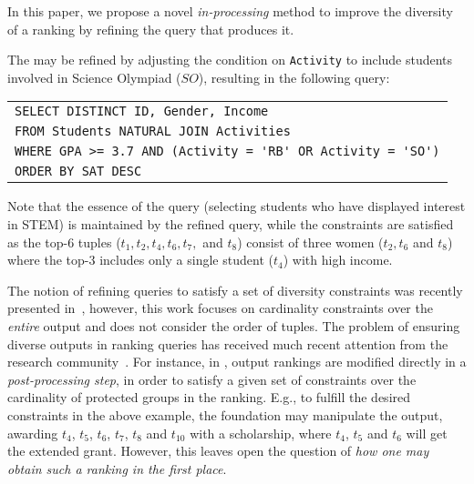  In this paper, we propose a novel \emph{in-processing} method to improve the diversity of a ranking by refining the query that produces it.%
 
 \begin{example}
    \label{ex:first_refinement}
    The \running{} may be refined by adjusting the condition on \verb"Activity" to include students involved in Science Olympiad ($SO$), resulting in the following query:
    \begin{center}
    \footnotesize
    \begin{tabular}{l}
        \verb"SELECT DISTINCT ID, Gender, Income "\\
        \verb"FROM Students NATURAL JOIN Activities"\\
        \verb"WHERE GPA >= 3.7 AND (Activity = 'RB' OR Activity = 'SO')"\\
        \verb"ORDER BY SAT DESC"\\
    \end{tabular}
    \end{center}
    Note that the essence of the query (selecting students who have displayed interest in STEM) is maintained by the refined query, while the constraints are satisfied as the top-$6$ tuples ($t_1, t_2, t_4, t_6, t_7,$ and $t_8$) consist of three women ($t_2, t_6$ and $t_8$) where the top-$3$ includes only a single student ($t_4$) with high income.
    
    
\end{example}


 

The notion of refining queries to satisfy a set of diversity constraints was recently presented in~\cite{ERICA, ERICAfull}, however, this work focuses on cardinality constraints over the {\it entire} output and does not consider the order of tuples.
The problem of ensuring diverse outputs in ranking queries has received much recent attention from the research community~\cite{YS17, CSV18, YGS19, AJS19, KR18, CMV20}. For instance, in \cite{YS17, CSV18, YGS19}, output rankings are modified directly in a \emph{post-processing step}, in order to satisfy a given set of constraints over the cardinality of protected groups in the ranking. E.g., to fulfill the desired constraints in the above example, the foundation may manipulate the output, awarding $t_4$, $t_5$, $t_6$, $t_7$, $t_8$ and $t_{10}$ with a scholarship, where $t_4$, $t_5$ and $t_6$ will get the extended grant. However, this leaves open the question of \emph{how one may obtain such a ranking in the first place}.



